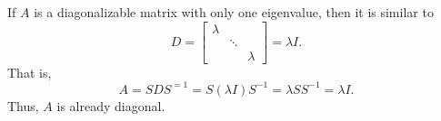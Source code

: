 If $A$ is a diagonalizable matrix with only one eigenvalue, then it is similar to $$D=\begin{bmatrix} \lambda && \\ &\ddots& \\ && \lambda \end{bmatrix}=\lambda I.$$ That is, $$A=SDS^{=1}=S(\lambda I)S^{-1}=\lambda SS^{-1} = \lambda I.$$ Thus, $A$ is already diagonal.